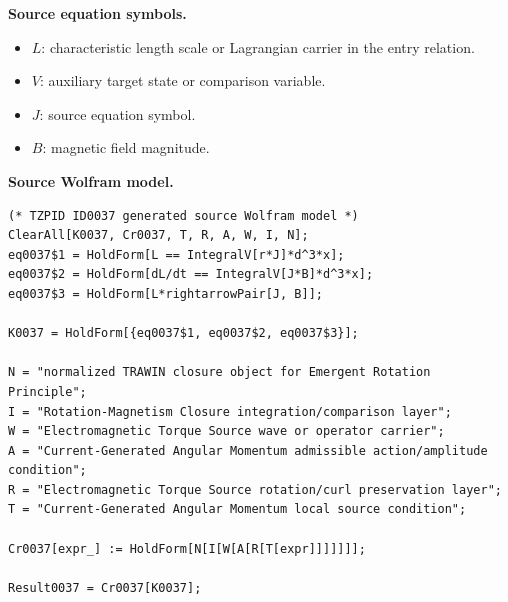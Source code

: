 \begin{minipage}[t]{0.49\linewidth}
\begingroup
\small
\raggedright
\textbf{Source equation symbols.}\par
\begin{itemize}[leftmargin=1.35em,itemsep=1pt,topsep=1pt,parsep=0pt]
    \item $L$: characteristic length scale or Lagrangian carrier in the entry relation.
    \item $V$: auxiliary target state or comparison variable.
    \item $J$: source equation symbol.
    \item $B$: magnetic field magnitude.
\end{itemize}
\endgroup
\end{minipage}\hfill
\begin{minipage}[t]{0.47\linewidth}
\begingroup
\scriptsize
\raggedright
\textbf{Source Wolfram model.}\par
\begin{Verbatim}[fontsize=\tiny,breaklines=true,breakanywhere=true]
(* TZPID ID0037 generated source Wolfram model *)
ClearAll[K0037, Cr0037, T, R, A, W, I, N];
eq0037$1 = HoldForm[L == IntegralV[r*J]*d^3*x];
eq0037$2 = HoldForm[dL/dt == IntegralV[J*B]*d^3*x];
eq0037$3 = HoldForm[L*rightarrowPair[J, B]];

K0037 = HoldForm[{eq0037$1, eq0037$2, eq0037$3}];

N = "normalized TRAWIN closure object for Emergent Rotation Principle";
I = "Rotation-Magnetism Closure integration/comparison layer";
W = "Electromagnetic Torque Source wave or operator carrier";
A = "Current-Generated Angular Momentum admissible action/amplitude condition";
R = "Electromagnetic Torque Source rotation/curl preservation layer";
T = "Current-Generated Angular Momentum local source condition";

Cr0037[expr_] := HoldForm[N[I[W[A[R[T[expr]]]]]]];

Result0037 = Cr0037[K0037];
\end{Verbatim}
\endgroup
\end{minipage}


